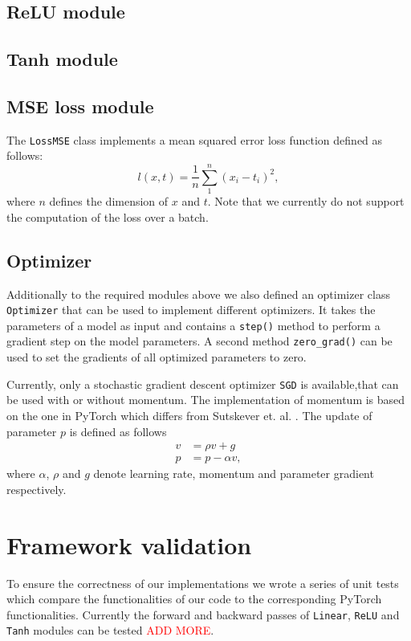 \documentclass[10pt,conference,compsocconf]{IEEEtran}
\begin{document}
\subsection{ReLU module}

\subsection{Tanh module}

\subsection{MSE loss module}
The \texttt{LossMSE} class implements a mean squared error loss function defined as follows:
\begin{equation} \label{eq:MSE}
  l(x,t) = \frac{1}{n} \sum_1^n{(x_i - t_i)^2}, 
\end{equation}
where $n$ defines the dimension of $x$ and $t$. Note that we currently do not support the computation of the loss over a batch.

\subsection{Optimizer}
Additionally to the required modules above we also defined an optimizer class \texttt{Optimizer} that can be used to implement different optimizers. It takes the parameters of a model as input and contains a \texttt{step()} method to perform a gradient step on the model parameters. A second method \texttt{zero\_grad()} can be used to set the gradients of all optimized parameters to zero. 

Currently, only a stochastic gradient descent optimizer \texttt{SGD} is available,that can be used with or without momentum. The implementation of momentum is based on the one in PyTorch which differs from Sutskever et. al. \cite{sutskever2013importance}. The update of parameter $p$ is defined as follows 
\begin{equation} \label{eq:SGDmoment}
  \begin{aligned}
    v &= \rho v + g \\
    p &= p - \alpha v,
  \end{aligned}
\end{equation}
where $\alpha$, $\rho$ and $g$ denote learning rate, momentum and parameter gradient respectively.

\section{Framework validation}
To ensure the correctness of our implementations we wrote a series of unit tests which compare the functionalities of our code to the corresponding PyTorch functionalities. Currently the forward and backward passes of \texttt{Linear}, \texttt{ReLU} and \texttt{Tanh} modules can be tested \textcolor{red}{ADD MORE}.
\end{document}
